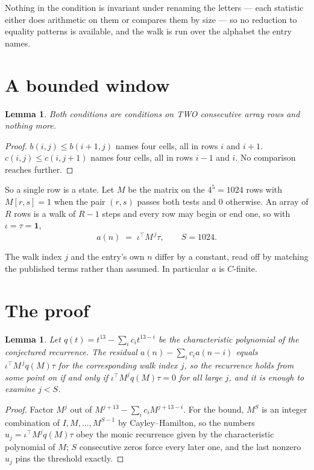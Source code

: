\documentclass[11pt,a4paper]{article}
\theoremstyle{plain}
\newtheorem{lemma}[theorem]{Lemma}
\theoremstyle{definition}
\begin{document}
Nothing in the condition is invariant under renaming the letters --- each statistic either does
arithmetic on them or compares them by size --- so no reduction to equality patterns is
available, and the walk is run over the alphabet the entry names.

\section{A bounded window}

\begin{lemma}\label{lem:win}
Both conditions are conditions on TWO consecutive array rows and nothing more.
\end{lemma}

\begin{proof}
$b(i,j)\le b(i{+}1,j)$ names four cells, all in rows $i$ and $i+1$. $c(i,j)\le c(i,j{+}1)$
names four cells, all in rows $i-1$ and $i$. No comparison reaches further.
\end{proof}

So a single row is a state. Let $M$ be the matrix on the $4^{5}=1024$ rows with
$M[r,s]=1$ when the pair $(r,s)$ passes both tests and $0$ otherwise. An array of $R$ rows is a
walk of $R-1$ steps and every row may begin or end one, so with $\iota=\tau=\mathbf{1}$,
\[
a(n)\;=\;\iota^{\!\top}M^{\,j}\tau ,\qquad S=1024.
\]

The walk index $j$ and the entry's own $n$ differ by a constant, read off by matching the
published terms rather than assumed. In particular $a$ is $C$-finite.

\section{The proof}

\begin{lemma}\label{lem:crit}
Let $q(t)=t^{13}-\sum_i c_it^{13-i}$ be the characteristic polynomial of the
conjectured recurrence. The residual $a(n)-\sum_ic_ia(n-i)$ equals
$\iota^{\!\top}M^{\,j}q(M)\tau$ for the corresponding walk index $j$, so the recurrence
holds from some point on if and only if $\iota^{\!\top}M^{j}q(M)\tau=0$ for all large $j$,
and it is enough to examine $j<S$.
\end{lemma}

\begin{proof}
Factor $M^{j}$ out of $M^{j+13}-\sum_ic_iM^{j+13-i}$. For the bound, $M^{S}$
is an integer combination of $I,M,\dots,M^{S-1}$ by Cayley--Hamilton, so the numbers
$u_j=\iota^{\!\top}M^{j}q(M)\tau$ obey the monic recurrence given by the characteristic
polynomial of $M$; $S$ consecutive zeros force every later one, and the last nonzero $u_j$
pins the threshold exactly.
\end{proof}
\end{document}
